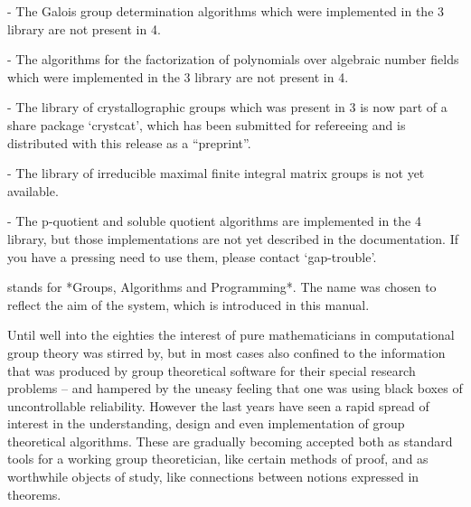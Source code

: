    \item{-} The Galois group determination algorithms which were
      implemented in the {\GAP} 3 library are not present in {\GAP} 4.
    
   \item{-} The algorithms for the factorization of polynomials over
   algebraic number fields which were implemented in the {\GAP} 3 library
   are not present in {\GAP} 4.

   \item{-} The library of crystallographic groups which was present in
     {\GAP} 3 is now part of a share package `crystcat', which has been
     submitted for refereeing and is distributed with this release as a
     ``preprint''.

   \item{-}  The library  of  irreducible maximal finite  integral matrix
   groups is not yet available.

   \item{-} The p-quotient and soluble quotient algorithms are
   implemented in the {\GAP} 4 library, but those implementations are not
   yet described in the documentation. If you have a pressing need to use
   them, please contact `gap-trouble'.
\endlist
      







{\GAP} stands for *Groups,  Algorithms  and  Programming*.  The name  was
chosen to reflect the  aim of the  system,  which is  introduced in  this
manual.

Until  well into the  eighties  the  interest  of pure mathematicians  in
computational  group theory  was  stirred  by,  but in  most  cases  also
confined to  the  information  that  was  produced  by  group theoretical
software  for  their special research  problems  --  and  hampered by the
uneasy  feeling  that  one  was   using  black  boxes  of  uncontrollable
reliability.  However the last years have seen a rapid spread of interest
in the understanding, design and even implementation of group theoretical
algorithms.  These are gradually becoming accepted both as standard tools
for a working group theoretician,  like certain  methods of proof, and as
worthwhile  objects of study, like  connections between notions expressed
in theorems.

